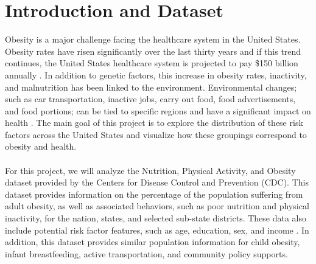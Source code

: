 \documentclass{article}
\begin{document}
 


\section{Introduction and Dataset}
\label{introduction}

Obesity is a major challenge facing the healthcare system in the United States. Obesity rates have risen significantly over the last thirty years and if this trend continues, the United States healthcare system is projected to pay \$150 billion annually \cite{hurt2010obesity}.
In addition to genetic factors, this increase in obesity rates, inactivity, and malnutrition has been linked to the environment. 
Environmental changes; such as car transportation, inactive jobs, carry out food, food advertisements, and food portions; can be tied to specific regions and have a significant impact on health \cite{whyobesityhealthproblem, understandingadultoverweight}. 
The main goal of this project is to explore the distribution of these risk factors across the United States and visualize how these groupings correspond to obesity and health.
\\\\
For this project, we will analyze the Nutrition, Physical Activity, and Obesity dataset provided by the Centers for Disease Control and Prevention (CDC).
This dataset provides information on the percentage of the population suffering from adult obesity, as well as associated behaviors, such as poor nutrition and physical inactivity, for the nation, states, and selected sub-state districts. 
These data also include potential risk factor features, such as age, education, sex, and income \cite{nutphysactobesitydata}.
In addition, this dataset provides similar population information for child obesity, infant breastfeeding, active transportation, and community policy supports.
\end{document}
